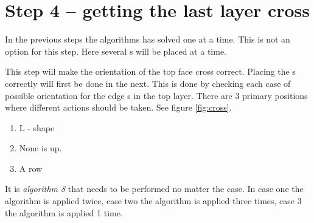 \section{Step 4 --  getting the last layer cross}
In the previous steps the algorithms has solved one \cpiece{} at a time. 
This is not an option for this step. 
Here several \cpiece{}s will be placed at a time. 

This step will make the orientation of the top face cross correct. 
Placing the \cpiece{}s correctly will first be done in the next. 
This is done by checking each case of possible orientation for the edge \cpiece{}s in the top layer. 
There are 3 primary positions where different actions should be taken. See figure \ref{fig:cross}. 
\begin{enumerate}
\item L - shape
\item None is up.
\item A row
\end{enumerate}
It is \textit{algorithm 8} that needs to be performed no matter the case. In case one the algorithm is applied twice, case two the algorithm is applied three times, case 3 the algorithm is applied 1 time. 




